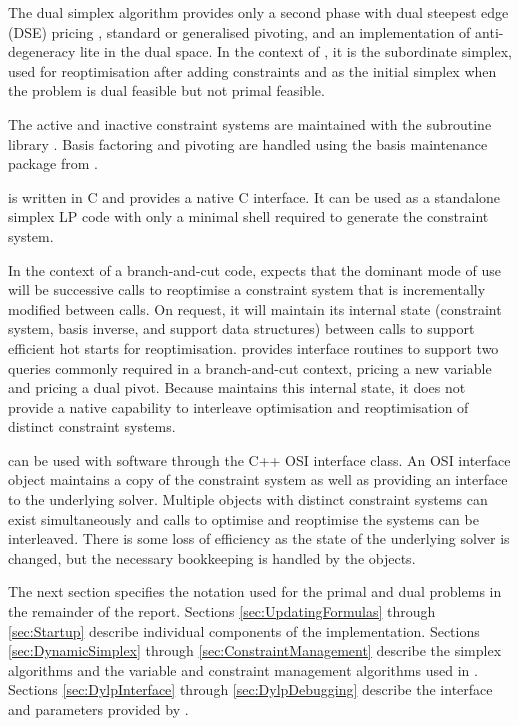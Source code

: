 The dual simplex algorithm provides only a second phase with
dual steepest edge (DSE) pricing \cite[algorithm `steepest 1']{For92},
standard or generalised pivoting,
and an implementation of anti-degeneracy lite in the dual space.
In the context of \dylp, it is the subordinate simplex, used for
reoptimisation after adding constraints and as the initial simplex when the
problem is dual feasible but not primal feasible.

The active and inactive constraint systems are maintained with the \consys
subroutine library \cite{Haf98b}.
Basis factoring and pivoting are handled using the basis maintenance package
from \glpk \cite{GLPK,Mak01}.

\dylp is written in C and provides a native C interface.
It can be used as a standalone simplex LP code with only a minimal shell
required to generate the constraint system.

In the context of a branch-and-cut code, \dylp expects that the dominant
mode of use will be successive calls to
reoptimise a constraint system that is incrementally modified between calls.
On request, it will maintain its internal state (constraint system,
basis inverse, and support data structures) between calls to support
efficient hot starts for reoptimisation.
\dylp provides interface routines to support two queries commonly required in
a branch-and-cut context, pricing a new variable and pricing a dual pivot.
Because \dylp maintains this internal state, it does not provide a native
capability to interleave optimisation and reoptimisation of distinct
constraint systems.

\dylp can be used with \coin \cite{COIN} software through
the C++  OSI interface class.
An OSI interface object maintains a copy of the constraint system as
well as providing an interface to the underlying solver.
Multiple  objects with distinct constraint systems can exist
simultaneously and calls to optimise and reoptimise the systems can be
interleaved.
There is some loss of efficiency as the state of the underlying solver is
changed, but the necessary bookkeeping is handled by the 
objects.

The next section specifies the notation used for the
primal and dual problems in the remainder of the report.
Sections \ref{sec:UpdatingFormulas} through \ref{sec:Startup}
describe individual components of the implementation.
Sections \ref{sec:DynamicSimplex} through \ref{sec:ConstraintManagement}
describe the simplex algorithms and the variable and constraint management
algorithms used in \dylp.
Sections \ref{sec:DylpInterface} through \ref{sec:DylpDebugging} describe
the interface and parameters provided by \dylp.
